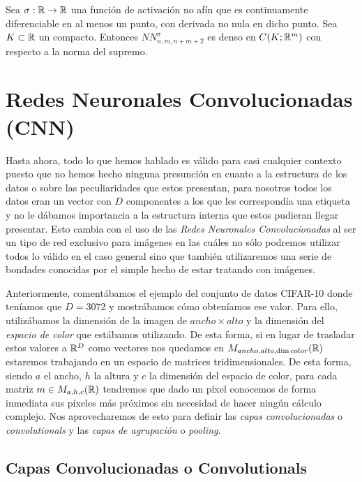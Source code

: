 \begin{teorema}
Sea $\sigma : \mathbb{R} \to \mathbb{R}$ una función de activación no afín que es continuamente diferenciable en al menos un punto, con derivada no nula en dicho punto. Sea $K \subset \mathbb{R}$ un compacto. Entonces $NN_{n,m,n+m+2}^\sigma$ es denso en $C(K;\mathbb{R}^m)$ con respecto a la norma del supremo.
\end{teorema}

\chapter{Redes Neuronales Convolucionadas (CNN)}

Hasta ahora, todo lo que hemos hablado es válido para casi cualquier contexto puesto que no hemos hecho ninguna presunción en cuanto a la estructura de los datos o sobre las peculiaridades que estos presentan, para nosotros todos los datos eran un vector con $D$ componentes a los que les correspondía una etiqueta y no le dábamos importancia a la estructura interna que estos pudieran llegar presentar. Esto cambia con el uso de las \emph{Redes Neuronales Convolucionadas} al ser un tipo de red exclusivo para imágenes en las cuáles no sólo podremos utilizar todos lo válido en el caso general sino que también utilizaremos una serie de bondades conocidas por el simple hecho de estar tratando con imágenes.\newline

Anteriormente, comentábamos el ejemplo del conjunto de datos CIFAR-10 donde teníamos que $D=3072$ y mostrábamos cómo obteníamos ese valor. Para ello, utilizábamos la dimensión de la imagen de $ancho \times alto $ y la dimensión del \emph{espacio de color} que estábamos utilizando. De esta forma, si en lugar de trasladar estos valores a $\mathbb{R}^D$ como vectores nos quedamos en $M_{ancho,alto, \dim color}(\mathbb{R})$ estaremos trabajando en un espacio de matrices tridimensionales. De esta forma, siendo $a$ el ancho, $h$ la altura y $c$ la dimensión del espacio de color, para cada matriz $m \in M_{a, h,c}(\mathbb{R})$ tendremos que dado un píxel conocemos de forma inmediata sus píxeles más próximos sin necesidad de hacer ningún cálculo complejo. Nos aprovecharemos de esto para definir las \emph{capas convolucionadas} o \emph{convolutionals} y las \emph{capas de agrupación} o \emph{pooling}.\newline

\section{Capas Convolucionadas o Convolutionals}

